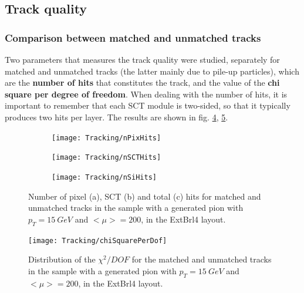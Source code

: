 \documentclass[a4paper,twoside,12pt]{article}
\begin{document}
\subsection{Track quality}\label{subsec:tracking:quality}

\subsubsection{Comparison between matched and unmatched tracks}

Two parameters that measures the track quality were studied, separately for matched and unmatched tracks (the latter mainly due to pile-up particles), which
are the \textbf{number of hits} that constitutes the track, and the value of the \textbf{chi square per degree of freedom}. When dealing with the number
of hits, it is important to remember that each SCT module is two-sided, so that it typically produces two hits per layer. The results are shown in fig. \ref{fig:tracking:nHits}, \ref{fig:tracking:chiSquare}. \\

\begin{figure}
\begin{subfigure}{\linewidth}
\centering
\texttt{[image: Tracking/nPixHits]}
\caption{}
\label{fig:tracking:nPixHits}
\end{subfigure}

\begin{subfigure}{\linewidth}
\centering
\texttt{[image: Tracking/nSCTHits]}
\caption{}
\label{fig:tracking:nSCTHits}
\end{subfigure}

\begin{subfigure}{\linewidth}
\centering
\texttt{[image: Tracking/nSiHits]}
\caption{}
\label{fig:tracking:nSiHits}
\end{subfigure}
\caption{Number of pixel (a), SCT (b) and total (c) hits for matched and unmatched tracks in the sample with a generated pion with $p_{T} = 15\ GeV$ and $<\mu> = 200$, in the ExtBrl4 layout.}
\label{fig:tracking:nHits}
\end{figure}

\begin{figure}
\centering
\texttt{[image: Tracking/chiSquarePerDof]}
\caption{Distribution of the $\chi^2/DOF$ for the matched and unmatched tracks in the sample with a generated pion with $p_{T} = 15\ GeV$ and $<\mu> = 200$, in the ExtBrl4 layout.}
\label{fig:tracking:chiSquare}
\end{figure}
\end{document}
